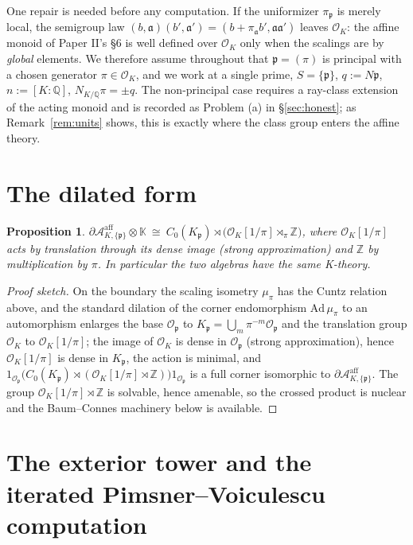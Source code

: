\documentclass[11pt]{amsart}
\newtheorem{proposition}[theorem]{Proposition}
\theoremstyle{remark}
\newcommand{\OK}{\mathcal{O}_K}
\newcommand{\Op}{\mathcal{O}_\pp}
\newcommand{\pp}{\mathfrak{p}}
\newcommand{\Z}{\mathbb{Z}}
\newcommand{\Q}{\mathbb{Q}}
\newcommand{\K}{\mathbb{K}}
\newcommand{\Ns}{N}
\newcommand{\Aaff}{\mathcal{A}^{\mathrm{aff}}}
\begin{document}
One repair is needed before any computation. If the uniformizer $\pi_\pp$ is merely local,
the semigroup law $(b,\mathfrak a)(b',\mathfrak a')=(b+\pi_{\mathfrak a}b',\mathfrak
a\mathfrak a')$ leaves $\OK$: the affine monoid of Paper II's \S6 is well defined over
$\OK$ only when the scalings are by \emph{global} elements. We therefore assume throughout
that $\pp=(\pi)$ is principal with a chosen generator $\pi\in\OK$, and we work at a single
prime, $S=\{\pp\}$, $q:=\Ns\pp$, $n:=[K:\Q]$, $\Ns_{K/\Q}\pi=\pm q$. The non-principal
case requires a ray-class extension of the acting monoid and is recorded as Problem (a) in
\S\ref{sec:honest}; as Remark~\ref{rem:units} shows, this is exactly where the class group
enters the affine theory.

\section{The dilated form}\label{sec:reduction}

\begin{proposition}\label{prop:dilation}
$\partial\Aaff_{K,\{\pp\}}\otimes\K\ \cong\
C_0(K_\pp)\rtimes\bigl(\OK[1/\pi]\rtimes_\pi\Z\bigr)$, where $\OK[1/\pi]$ acts by
translation through its dense image (strong approximation) and $\Z$ by multiplication by
$\pi$. In particular the two algebras have the same K-theory.
\end{proposition}

\begin{proof}[Proof sketch]
On the boundary the scaling isometry $\mu_\pi$ has the Cuntz relation above, and the
standard dilation of the corner endomorphism $\mathrm{Ad}\,\mu_\pi$ to an automorphism
enlarges the base $\Op$ to $K_\pp=\bigcup_m\pi^{-m}\Op$ and the translation group $\OK$ to
$\OK[1/\pi]$; the image of $\OK$ is dense in $\Op$ (strong approximation), hence
$\OK[1/\pi]$ is dense in $K_\pp$, the action is minimal, and
$1_{\Op}\bigl(C_0(K_\pp)\rtimes(\OK[1/\pi]\rtimes\Z)\bigr)1_{\Op}$ is a full corner
isomorphic to $\partial\Aaff_{K,\{\pp\}}$. The group $\OK[1/\pi]\rtimes\Z$ is solvable,
hence amenable, so the crossed product is nuclear and the Baum--Connes machinery below is
available.
\end{proof}

\section{The exterior tower and the iterated Pimsner--Voiculescu computation}\label{sec:pv}
\end{document}
